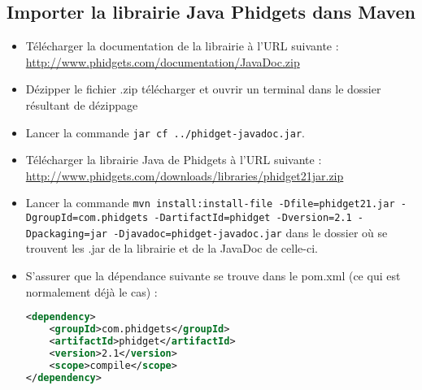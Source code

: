 \subsection{Importer la librairie Java Phidgets dans Maven}
\begin{itemize}
\item Télécharger la documentation de la librairie à l’URL suivante : \url{http://www.phidgets.com/documentation/JavaDoc.zip}
\item Dézipper le fichier .zip télécharger et ouvrir un terminal dans le dossier résultant de dézippage
\item Lancer la commande \texttt{jar cf ../phidget-javadoc.jar}.
\item Télécharger la librairie Java de Phidgets à l’URL suivante : \url{http://www.phidgets.com/downloads/libraries/phidget21jar.zip}
\item Lancer la commande \texttt{mvn install:install-file -Dfile=phidget21.jar -DgroupId=com.phidgets -DartifactId=phidget -Dversion=2.1 -Dpackaging=jar -Djavadoc=phidget-javadoc.jar} dans le dossier où se trouvent les .jar de la librairie et de la JavaDoc de celle-ci.
\item S'assurer que la dépendance suivante se trouve dans le pom.xml (ce qui est normalement déjà le cas) :
\begin{lstlisting}[language=XML, numbers=none]
<dependency>
    <groupId>com.phidgets</groupId>
    <artifactId>phidget</artifactId>
    <version>2.1</version>
    <scope>compile</scope>
</dependency>
\end{lstlisting}
\end{itemize}